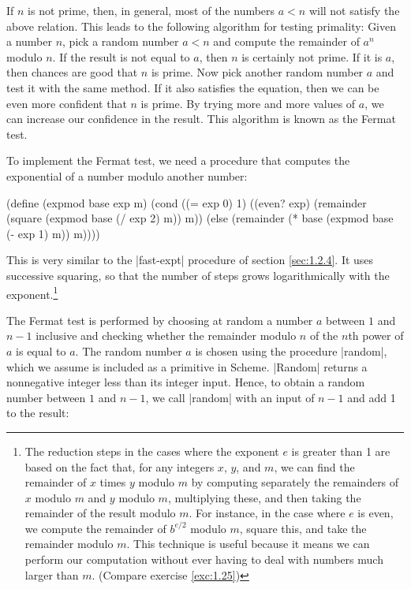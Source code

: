 If $n$ is not prime, then, in general, most of the numbers $a < n$ will not
satisfy the above relation.  This leads to the following algorithm for
testing primality: Given a number $n$, pick a random number $a < n$ and
compute the remainder of $a^n$ modulo $n$.  If the result is not equal to
$a$, then $n$ is certainly not prime.  If it is $a$, then chances are good
that $n$ is prime.  Now pick another random number $a$ and test it with the
same method.  If it also satisfies the equation, then we can be even more
confident that $n$ is prime.  By trying more and more values of $a$, we can
increase our confidence in the result.  This algorithm is known as the
Fermat test.

To implement the Fermat test, we need a procedure that computes the
exponential of a number modulo another number:

\begin{schemedisplay}
(define (expmod base exp m)
  (cond ((= exp 0) 1)
        ((even? exp)
         (remainder (square (expmod base (/ exp 2) m))
                    m))
        (else
         (remainder (* base (expmod base (- exp 1) m))
                    m))))        
\end{schemedisplay}
This is very similar to the \scheme|fast-expt| procedure of section
\ref{sec:1.2.4}.  It uses successive squaring, so that the number of
steps grows logarithmically with the exponent.\footnote{The reduction
  steps in the cases where the exponent $e$ is greater than 1
  are based on the fact that, for any integers $x$, $y$,
  and $m$, we can find the remainder of $x$ times
  $y$ modulo $m$ by computing separately the remainders
  of $x$ modulo $m$ and $y$ modulo $m$,
  multiplying these, and then taking the remainder of the result
  modulo $m$.  For instance, in the case where $e$ is
  even, we compute the remainder of $b^{e/2}$
  modulo $m$, square this, and take the remainder modulo
  $m$.  This technique is useful because it means we can
  perform our computation without ever having to deal with numbers
  much larger than $m$.  (Compare exercise \ref{exc:1.25})}

The Fermat test is performed by choosing at random a number $a$
between $1$ and $n - 1$ inclusive and checking whether the remainder
modulo $n$ of the $n$th power of $a$ is equal to $a$.  The random
number $a$ is chosen using the procedure \scheme|random|, which we assume is
included as a primitive in Scheme. \scheme|Random| returns a
nonnegative integer less than its integer input.  Hence, to obtain a random
number between $1$ and $n - 1$, we call \scheme|random| with an input of
$n - 1$ and add 1 to the result:

